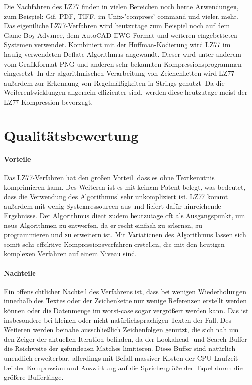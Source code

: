 \documentclass[10pt, a4paper]{article}
\begin{document}
\noindent
Die Nachfahren des LZ77 finden in vielen Bereichen noch heute Anwendungen, zum Beispiel: Gif, PDF, TIFF, im Unix-'compress' command und vielen mehr. Das eigentliche LZ77-Verfahren wird heutzutage zum Beispiel noch auf dem Game Boy Advance, dem AutoCAD DWG Format und weiteren eingebetteten Systemen verwendet. Kombiniert mit der Huffman-Kodierung wird LZ77 im häufig verwendeten Deflate-Algorithmus angewandt. Dieser wird unter anderem vom Grafikformat PNG und anderen sehr bekannten Kompressionsprogrammen eingesetzt. In der algorithmischen Verarbeitung von Zeichenketten wird LZ77 außerdem zur Erkennung von Regelmäßigkeiten in Strings genutzt. Da die Weiterentwicklungen allgemein effizienter sind, werden diese heutzutage meist der LZ77-Kompression bevorzugt. \cite{website:kompression}

\section{Qualitätsbewertung}
\paragraph{Vorteile}
Das LZ77-Verfahren hat den großen Vorteil, dass es ohne Textkenntnis komprimieren kann. Des Weiteren ist es mit keinem Patent belegt, was bedeutet, dass die Verwendung des Algorithmus' sehr unkompliziert ist. LZ77 kommt außerdem mit wenig Systemressourcen aus und liefert dafür hinreichende Ergebnisse. Der Algorithmus dient zudem heutzutage oft als Ausgangspunkt, um neue Algorithmen zu entwerfen, da er recht einfach zu erlernen, zu programmieren und zu erweitern ist. Mit Variationen des Algorithmus lassen sich somit sehr effektive Kompressionsverfahren erstellen, die mit den heutigen komplexen Verfahren auf einem Niveau sind.

\paragraph{Nachteile}
Ein offensichtlicher Nachteil des Verfahrens ist, dass bei wenigen Wiederholungen innerhalb des Textes oder der Zeichenkette nur wenige Referenzen erstellt werden können oder die Datenmenge im worst-case sogar vergrößert werden kann. Das ist insbesondere bei kleinen oder nicht natürlichsprachigen Texten der Fall. Des Weiteren werden beinahe ausschließlich Zeichenfolgen genutzt, die sich nah um den Zeiger der aktuellen Iteration befinden, da der Lookahead- und Search-Buffer die Reichweite der gefundenen Matches limitieren. Diese Buffer sind natürlich unendlich erweiterbar, allerdings mit Befall massiver Kosten der CPU-Laufzeit bei der Kompression und Auswirkung auf die Speichergröße der Tupel durch die größere Bufferlänge.
\end{document}

